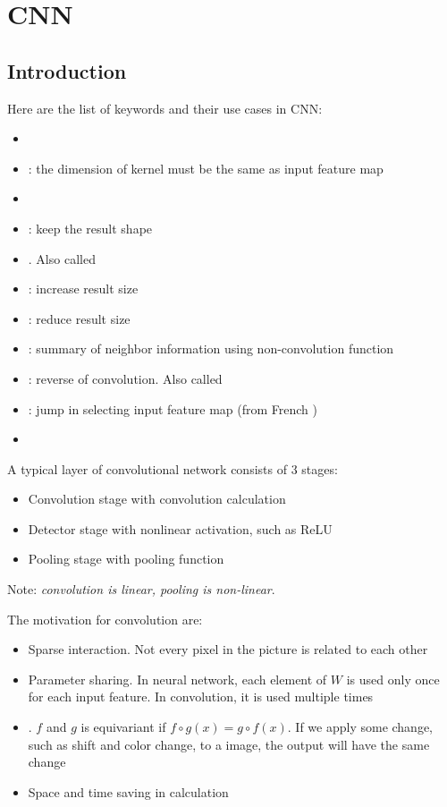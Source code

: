 \chapter{CNN}

\section{Introduction}

Here are the list of keywords and their use cases in CNN:
    \begin{itemize}
        \item {}
        \item {}: the dimension of kernel must be the same as input feature map
        \item {}
        \item {}: keep the result shape
        \item {}. Also called 
        \item {}: increase result size
        \item {}: reduce result size
        \item {}: summary of neighbor information using non-convolution function
        \item {}: reverse of convolution. Also called 
        \item {}: jump in selecting input feature map (from French )
        \item {}
    \end{itemize}


A typical layer of convolutional network consists of 3 stages:
\begin{itemize}
    \item Convolution stage with convolution calculation
    \item Detector stage with nonlinear activation, such as ReLU
    \item Pooling stage with pooling function
\end{itemize}

Note: \emph{convolution is linear, pooling is non-linear}.


The motivation for convolution are:
\begin{itemize}
    \item Sparse interaction. Not every pixel in the picture is related to each other
    \item Parameter sharing. In neural network, each element of $W$ is used only once for each input feature. In convolution, it is used multiple times
    \item {}. $f$ and $g$ is equivariant if $f \circ g(x) = g \circ f(x)$. If we apply some change, such as shift and color change, to a image, the output will have the same change
    \item Space and time saving in calculation
\end{itemize}


